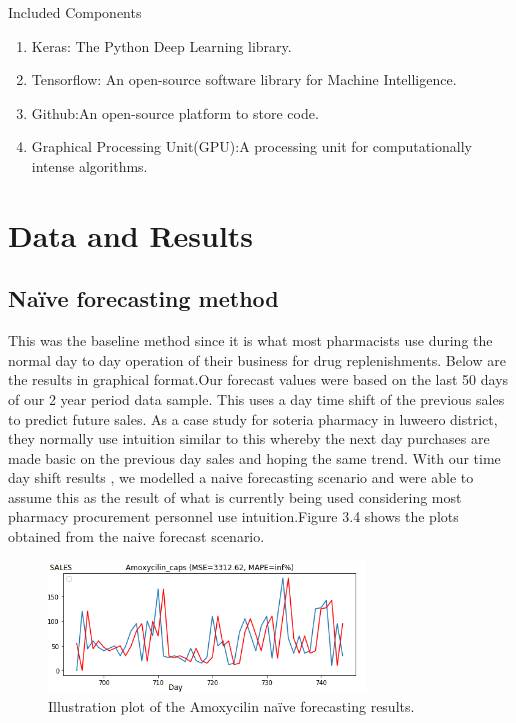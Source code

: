\documentclass[12pt]{report}
\begin{document}
Included Components\\
\begin{enumerate}
  \item Keras: The Python Deep Learning library.
  \item Tensorflow: An open-source software library for Machine Intelligence.
  \item Github:An open-source platform to store code.
  \item Graphical Processing Unit(GPU):A processing unit for computationally intense algorithms.
\end{enumerate}


\section{Data and Results}

\subsection{Naïve forecasting method}
This was the baseline method since it is what most pharmacists use during the normal day to day operation of their business for drug replenishments. Below are the results in graphical format.Our forecast values were based on the last 50 days of our 2 year period data sample.
This uses a day time shift of the previous sales to predict future sales. As a case study for soteria pharmacy in luweero district, they normally use intuition similar to this whereby the next day purchases are made basic on the previous day sales and hoping the same trend.
With our time day shift results , we modelled a naive forecasting scenario and were able to assume this as the result of what is currently being used considering most pharmacy procurement personnel use intuition.Figure 3.4 shows the plots obtained from the naive forecast scenario.

\begin{figure}[H]%
  \begin {center}
  \includegraphics[width=0.75\textwidth]{images/download (13)A.png}
  \caption{Illustration plot of the Amoxycilin naïve forecasting results.}
  \label{fig:ecg}
  \end {center}
\end{figure}
\end{document}
